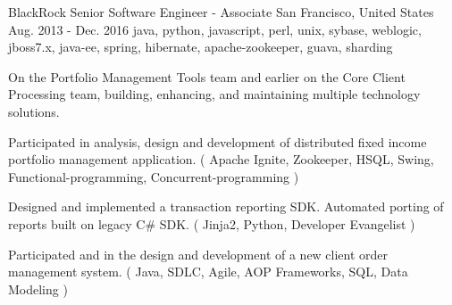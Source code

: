 \cventry
    {BlackRock} %
    {Senior Software Engineer - Associate} %
    {San Francisco, United States} %
    {Aug. 2013 - Dec. 2016} %
    {java, python, javascript, perl, unix, sybase, weblogic, jboss7.x, java-ee, spring, hibernate, apache-zookeeper, guava, sharding}%
    {
        On the Portfolio Management Tools team and earlier on the Core Client Processing team, building, enhancing, and maintaining multiple technology solutions.
    \begin{cvitems} %
        \item { Participated in analysis, design and development of distributed fixed income portfolio management application. ( Apache Ignite, Zookeeper, HSQL, Swing, Functional-programming, Concurrent-programming )}
        \item { Designed and implemented a transaction reporting SDK. Automated porting of reports built on legacy C\# SDK. ( Jinja2, Python, Developer Evangelist )}
        \item { Participated and in the design and development of a new client order management system. ( Java, SDLC, Agile, AOP Frameworks, SQL, Data Modeling )}
    \end{cvitems}
    }